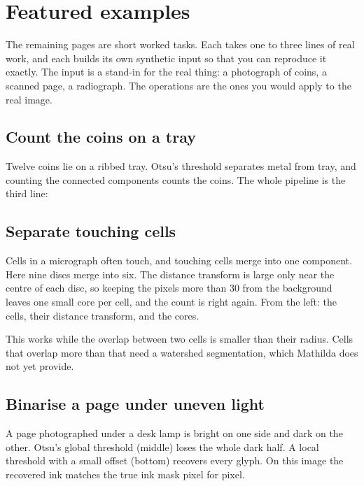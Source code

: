 \section{Featured examples}
\label{sec:img-featured}

The remaining pages are short worked tasks. Each takes one to three lines of real
work, and each builds its own synthetic input so that you can reproduce it
exactly. The input is a stand-in for the real thing: a photograph of coins, a
scanned page, a radiograph. The operations are the ones you would apply to the
real image.

\subsection*{Count the coins on a tray}

Twelve coins lie on a ribbed tray. Otsu's threshold separates metal from tray,
and counting the connected components counts the coins. The whole pipeline is the
third line:


\subsection*{Separate touching cells}

Cells in a micrograph often touch, and touching cells merge into one component.
Here nine discs merge into six. The distance transform is large only near the
centre of each disc, so keeping the pixels more than \(30\) from the background
leaves one small core per cell, and the count is right again. From the left: the
cells, their distance transform, and the cores.


This works while the overlap between two cells is smaller than their radius.
Cells that overlap more than that need a watershed segmentation, which Mathilda
does not yet provide.

\subsection*{Binarise a page under uneven light}

A page photographed under a desk lamp is bright on one side and dark on the other.
Otsu's global threshold (middle) loses the whole dark half. A local threshold with
a small offset (bottom) recovers every glyph. On this image the recovered ink
matches the true ink mask pixel for pixel.

